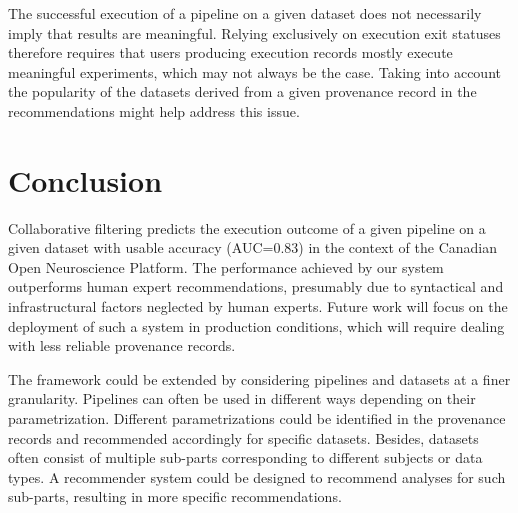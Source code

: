 \documentclass[conference]{IEEEtran}
\begin{document}
The successful execution of a pipeline on a given dataset 
does not necessarily imply that results are meaningful. Relying exclusively 
on execution exit statuses therefore requires that users producing execution records mostly execute meaningful experiments, which may not always be the case. Taking into account the popularity of
the datasets derived from a given provenance record in the recommendations might help address this issue.




\section{Conclusion}

Collaborative filtering predicts the execution outcome of a given pipeline
on a given dataset with usable accuracy (AUC=0.83) in the context of the
Canadian Open Neuroscience Platform. The performance achieved by our system
outperforms
human expert recommendations, presumably due to syntactical and
infrastructural factors neglected by human experts. 
Future work will focus on the deployment of such a system in production conditions, which will require dealing with less reliable provenance records.



The framework could be extended by considering pipelines and datasets 
at a finer granularity. Pipelines can often be used in different ways 
depending on their parametrization. Different parametrizations could 
be identified in the provenance records and recommended accordingly 
for specific datasets. Besides, datasets often consist of multiple 
sub-parts corresponding to different subjects or data types. A recommender 
system could be designed to recommend analyses for such sub-parts, 
resulting in more specific recommendations.
\end{document}
